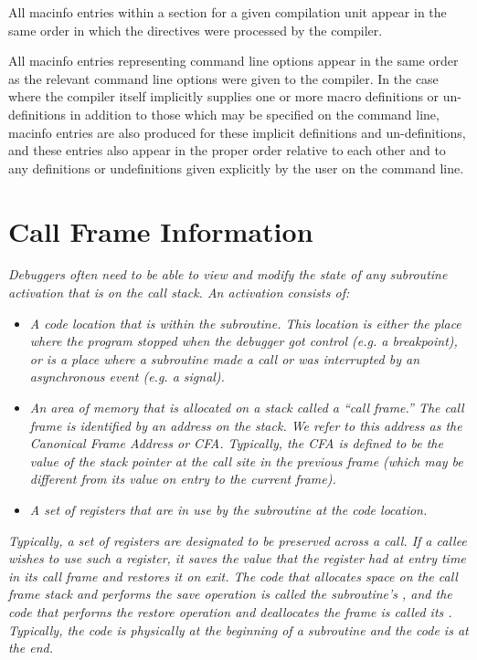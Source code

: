 All macinfo entries within a 
section for a
given compilation unit appear in the same order in which the
directives were processed by the compiler.

All macinfo entries representing command line options appear
in the same order as the relevant command line options
were given to the compiler. In the case where the compiler
itself implicitly supplies one or more macro definitions or
un-definitions in addition to those which may be specified on
the command line, macinfo entries are also produced for these
implicit definitions and un-definitions, and these entries
also appear in the proper order relative to each other and
to any definitions or undefinitions given explicitly by the
user on the command line.



\section{Call Frame Information}
\label{chap:callframeinformation}




\textit{Debuggers often need to be able to view and modify the state of any subroutine activation that is
on the call stack. An activation consists of:}

\begin{itemize}
\item \textit{A code location that is within the
subroutine. This location is either the place where the program
stopped when the debugger got control (e.g. a breakpoint), or
is a place where a subroutine made a call or was interrupted
by an asynchronous event (e.g. a signal).}

\item \textit{An area of memory that is allocated on a stack called a
``call frame.'' The call frame is identified by an address
on the stack. We refer to this address as the Canonical
Frame Address or CFA. Typically, the CFA is defined to be the
value of the stack pointer at the call site in the previous
frame (which may be different from its value on entry to the
current frame).}

\item \textit{A set of registers that are in use by the subroutine
at the code location.}

\end{itemize}

\textit{Typically, a set of registers are designated to be preserved
across a call. If a callee wishes to use such a register, it
saves the value that the register had at entry time in its call
frame and restores it on exit. The code that allocates space
on the call frame stack and performs the save operation is
called the subroutine’s , and the code that performs
the restore operation and deallocates the frame is called its
. Typically, the 
 code is physically at the
beginning of a subroutine and the 
 code is at the end.}

